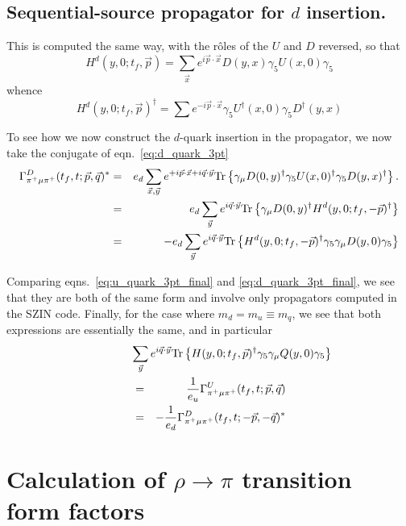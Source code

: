 \documentclass[12pt]{article}
\newcommand{\pdotx}{\vec{p} \cdot \vec{x}}
\newcommand{\qdoty}{\vec{q} \cdot \vec{y}}
\begin{document}
\subsection{Sequential-source propagator for $d$ insertion.}
This is computed the same way, with the r\^{o}les
of the $U$ and $D$ reversed, so that
\begin{equation}
H^d (y,0; t_f, \vec{p}) = \sum_{\vec{x}} e^{i \pdotx} D(y,x) \gamma_5
U(x,0) \gamma_5\label{eq:d_insert}
\end{equation}
whence
\begin{equation}
H^d (y,0; t_f, \vec{p})^{\dagger} = \sum e^{-i\pdotx}\gamma_5
U^{\dagger}(x,0)\gamma_5 D^{\dagger}(y,x)
\end{equation}

To see how we now construct the $d$-quark insertion in the propagator,
we now take the conjugate of eqn.~\ref{eq:d_quark_3pt}
\begin{eqnarray}
\Gamma_{\pi^+ \mu \pi^+}^D(t_f, t; \vec{p},\vec{q})^*  & =  & e_d
  \sum_{\vec{x},\vec{y}} e^{+i \pdotx + i \vec{q}\cdot\vec{y}} {\rm
  Tr} \left\{ \gamma_{\mu} D(0,y)^{\dagger} \gamma_5 U(x,0)^{\dagger}
  \gamma_5 D(y,x)^{\dagger}
  \right\}.\nonumber\\
& = & e_d \sum_{\vec{y}} e^{i\qdoty} {\rm Tr} \left\{ \gamma_{\mu}
  D(0,y)^{\dagger}  H^d(y,0; t_f, -\vec{p})^{\dagger}
  \right\}\nonumber\\
& = & - e_d \sum_{\vec{y}} e^{i\qdoty} {\rm Tr} \left\{ H^d(y,0;t_f,
  -\vec{p})^{\dagger} \gamma_5 \gamma_{\mu}
  D(y,0) \gamma_5 \right\}
\label{eq:d_quark_3pt_final}
\end{eqnarray}

Comparing eqns.~\ref{eq:u_quark_3pt_final} and
\ref{eq:d_quark_3pt_final}, we see that they are both of the same form
and involve only propagators computed in the SZIN code.  Finally, for
the case where $m_d = m_u \equiv m_q$, we see that both expressions
are essentially the same, and in particular
\begin{eqnarray}
\lefteqn{\sum_{\vec{y}} e^{i\qdoty} {\rm Tr} \left\{ H(y,0;t_f,
  \vec{p})^{\dagger} \gamma_5 \gamma_{\mu}
  Q(y,0) \gamma_5 \right\}\qquad  } \nonumber \\
   & = & \frac{1}{e_u} \Gamma^U_{\pi^+ \mu
  \pi^+}(t_f, t; \vec{p}, \vec{q})\nonumber \\ 
  & = & - \frac{1}{e_d} \Gamma^D_{\pi^+ \mu
  \pi^+}(t_f, t; - \vec{p}, - \vec{q})^*
\end{eqnarray}

\section{Calculation of $\rho \longrightarrow \pi$ transition form factors}
\end{document}

